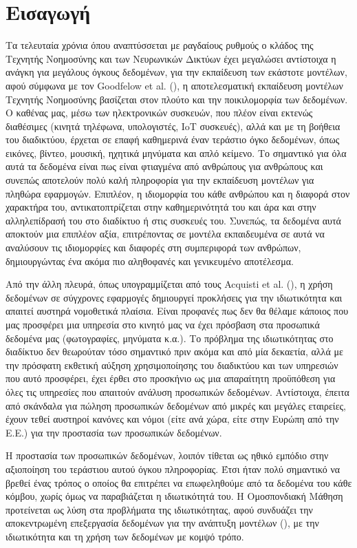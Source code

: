 \chapter{Εισαγωγή}

Τα τελευταία χρόνια όπου αναπτύσσεται με ραγδαίους ρυθμούς ο κλάδος της Τεχνητής Νοημοσύνης και των Νευρωνικών Δικτύων έχει μεγαλώσει αντίστοιχα η ανάγκη για μεγάλους όγκους δεδομένων, για την εκπαίδευση των εκάστοτε μοντέλων, αφού σύμφωνα με τον Goodfelow et al. (), η αποτελεσματική εκπαίδευση μοντέλων Τεχνητής Νοημοσύνης βασίζεται στον πλούτο και την ποικιλομορφία των δεδομένων. Ο καθένας μας, μέσω των ηλεκτρονικών συσκευών, που πλέον είναι εκτενώς διαθέσιμες (κινητά τηλέφωνα, υπολογιστές, IoT συσκευές), αλλά και με τη βοήθεια του διαδικτύου, έρχεται σε επαφή καθημερινά έναν τεράστιο όγκο δεδομένων, όπως εικόνες, βίντεο, μουσική, ηχητικά μηνύματα και απλό κείμενο. Το σημαντικό για όλα αυτά τα δεδομένα είναι πως είναι φτιαγμένα από ανθρώπους για ανθρώπους και συνεπώς αποτελούν πολύ καλή πληροφορία για την εκπαίδευση μοντέλων για πληθώρα εφαρμογών. Επιπλέον, η ιδιομορφία του κάθε ανθρώπου και η διαφορά στον χαρακτήρα του, αντικατοπτρίζεται στην καθημερινότητά του και άρα και στην αλληλεπίδρασή του στο διαδίκτυο ή στις συσκευές του. Συνεπώς, τα δεδομένα αυτά αποκτούν μια επιπλέον αξία, επιτρέποντας σε μοντέλα εκπαιδευμένα σε αυτά να αναλύσουν τις ιδιομορφίες και διαφορές στη συμπεριφορά των ανθρώπων, δημιουργώντας ένα ακόμα πιο αληθοφανές και γενικευμένο αποτέλεσμα. 

Από την άλλη πλευρά, όπως υπογραμμίζεται από τους Acquisti et al. (), η χρήση δεδομένων σε σύγχρονες εφαρμογές δημιουργεί προκλήσεις για την ιδιωτικότητα και απαιτεί αυστηρά νομοθετικά πλαίσια. Είναι προφανές πως δεν θα θέλαμε κάποιος που μας προσφέρει μια υπηρεσία στο κινητό μας να έχει πρόσβαση στα προσωπικά δεδομένα μας (φωτογραφίες, μηνύματα κ.α.). Το πρόβλημα της ιδιωτικότητας στο διαδίκτυο δεν θεωρούταν τόσο σημαντικό πριν ακόμα και από μία δεκαετία, αλλά με την πρόσφατη εκθετική αύξηση χρησιμοποίησης του διαδικτύου και των υπηρεσιών που αυτό προσφέρει, έχει έρθει στο προσκήνιο ως μια απαραίτητη προϋπόθεση για όλες τις υπηρεσίες που απαιτούν ανάλυση προσωπικών δεδομένων. Αντίστοιχα, έπειτα από σκάνδαλα για πώληση προσωπικών δεδομένων από μικρές και μεγάλες εταιρείες, έχουν τεθεί αυστηροί κανόνες και νόμοι (είτε ανά χώρα, είτε στην Ευρώπη από την Ε.Ε.) για την προστασία των προσωπικών δεδομένων.

Η προστασία των προσωπικών δεδομένων, λοιπόν τίθεται ως ηθικό εμπόδιο στην αξιοποίηση του τεράστιου αυτού όγκου πληροφορίας. Έτσι ήταν πολύ σημαντικό να βρεθεί ένας τρόπος ο οποίος θα επιτρέπει να επωφεληθούμε από τα δεδομένα του κάθε κόμβου, χωρίς όμως να παραβιάζεται η ιδιωτικότητά του. Η Ομοσπονδιακή Μάθηση προτείνεται ως λύση στα προβλήματα της ιδιωτικότητας, αφού συνδυάζει την αποκεντρωμένη επεξεργασία δεδομένων για την ανάπτυξη μοντέλων (), με την ιδιωτικότητα και τη χρήση των δεδομένων με κομψό τρόπο.

